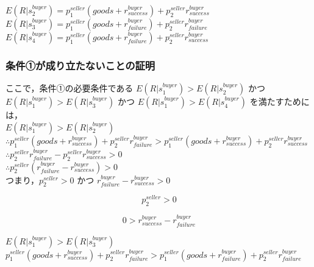 \documentclass[twocolumn, a4j]{article}
\begin{document}
$ E(R|s^{buyer}_2)=p^{seller}_1 (goods + r^{buyer}_{success}) + p^{seller}_2 r^{buyer}_{success}$ \\

$ E(R|s^{buyer}_3)=p^{seller}_1 (goods + r^{buyer}_{failure}) + p^{seller}_2 r^{buyer}_{failure}$ \\

$ E(R|s^{buyer}_4)=p^{seller}_1 (goods + r^{buyer}_{failure}) + p^{seller}_2 r^{buyer}_{success}$ \\

\subsubsection{条件①が成り立たないことの証明}

ここで，条件①の必要条件である
$E(R|s^{buyer}_1)>E(R|s^{buyer}_2)$
かつ
$E(R|s^{buyer}_1)>E(R|s^{buyer}_3)$
かつ
$E(R|s^{buyer}_1)>E(R|s^{buyer}_4)$
を満たすためには，\\

$ E(R|s^{buyer}_1) > E(R|s^{buyer}_2)$ \\

$\therefore p^{seller}_1 (goods + r^{buyer}_{success}) + p^{seller}_2 r^{buyer}_{failure} > p^{seller}_1 (goods + r^{buyer}_{success}) + p^{seller}_2 r^{buyer}_{success}$ \\

$\therefore p^{seller}_2 r^{buyer}_{failure} - p^{seller}_2 r^{buyer}_{success} > 0$ \\

$\therefore p^{seller}_2 (r^{buyer}_{failure} - r^{buyer}_{success}) > 0$ \\

つまり，$ p^{seller}_2 > 0$ かつ $ r^{buyer}_{failure} - r^{buyer}_{success} > 0$

\begin{equation}
  p^{seller}_2 > 0
\end{equation}

\begin{equation}
\label{quad1}
  0 > r^{buyer}_{success} - r^{buyer}_{failure}
\end{equation}

$ E(R|s^{buyer}_1) > E(R|s^{buyer}_3)$ \\

$ p^{seller}_1(goods + r^{buyer}_{success}) + p^{seller}_2r^{buyer}_{failure}>
  p^{seller}_1(goods + r^{buyer}_{failure}) + p^{seller}_2r^{buyer}_{failure}$\\
\end{document}
